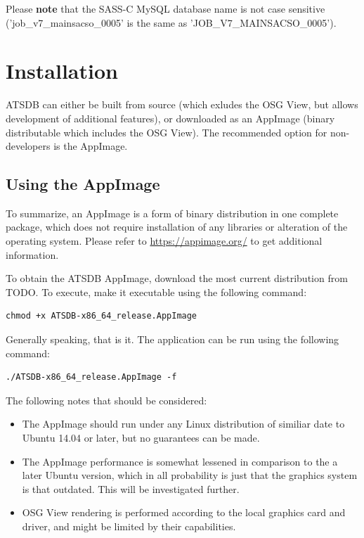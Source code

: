 \documentclass[10pt,letterpaper,extrafontsizes]{memoir}
\begin{document}
Please \textbf{note} that the SASS-C MySQL database name is not case sensitive ('job\_v7\_mainsacso\_0005' is the same as 'JOB\_V7\_MAINSACSO\_0005').

\chapter{Installation}
\label{sec:installation}

ATSDB can either be built from source (which exludes the OSG View, but allows development of additional features), or downloaded as an AppImage (binary distributable which includes the OSG View). The recommended option for non-developers is the AppImage.

\section{Using the AppImage}

To summarize, an AppImage is a form of binary distribution in one complete package, which does not require installation of any libraries or alteration of the operating system. Please refer to \url{https://appimage.org/} to get additional information.

To obtain the ATSDB AppImage, download the most current distribution from TODO. To execute, make it executable using the following command:
\begin{verbatim}
chmod +x ATSDB-x86_64_release.AppImage
\end{verbatim}

Generally speaking, that is it. The application can be run using the following command:
\begin{verbatim}
./ATSDB-x86_64_release.AppImage -f
\end{verbatim}

The following notes that should be considered:

\begin{itemize}  
\item The AppImage should run under any Linux distribution of similiar date to Ubuntu 14.04 or later, but no guarantees can be made.
\item The AppImage performance is somewhat lessened in comparison to the a later Ubuntu version, which in all probability is just that the graphics system is that outdated. This will be investigated further.
\item OSG View rendering is performed according to the local graphics card and driver, and might be limited by their capabilities.
\end{itemize}
\end{document}
